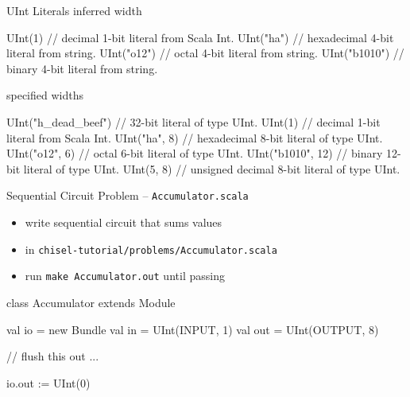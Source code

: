 \documentclass[xcolor=pdflatex,dvipsnames,table]{beamer}
\begin{document}
\begin{frame}[fragile]{UInt Literals}
inferred width
\begin{scala}
UInt(1)       // decimal 1-bit literal from Scala Int. 
UInt("ha")    // hexadecimal 4-bit literal from string.
UInt("o12")   // octal 4-bit literal from string. 
UInt("b1010") // binary 4-bit literal from string.
\end{scala}
specified widths
\begin{scala}
UInt("h_dead_beef") // 32-bit literal of type UInt.
UInt(1)             // decimal 1-bit literal from Scala Int.
UInt("ha", 8)       // hexadecimal 8-bit literal of type UInt.
UInt("o12", 6)      // octal 6-bit literal of type UInt.
UInt("b1010", 12)   // binary 12-bit literal of type UInt.
UInt(5, 8)          // unsigned decimal 8-bit literal of type UInt.
\end{scala}
\end{frame}


\begin{frame}[fragile]{Sequential Circuit Problem -- \tt Accumulator.scala}
\begin{itemize}
\item write sequential circuit that sums  values
\item in {\tt chisel-tutorial/problems/Accumulator.scala}
\item run {\tt make Accumulator.out} until passing
\end{itemize}
\begin{scala}
class Accumulator extends Module {
  val io = new Bundle {
    val in  = UInt(INPUT, 1)
    val out = UInt(OUTPUT, 8)
  }

  // flush this out ...

  io.out := UInt(0)
}
\end{scala}
\end{frame}
\end{document}
